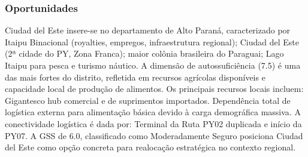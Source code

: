 \newpage

\subsubsection*{Oportunidades}\label{oport-ciudad-del-este-1001}
Ciudad del Este insere-se no departamento de Alto Paraná, caracterizado por Itaipu Binacional (royalties, empregos, infraestrutura regional); Ciudad del Este (2ª cidade do PY, Zona Franca); maior colônia brasileira do Paraguai; Lago Itaipu para pesca e turismo náutico. A dimensão de autossuficiência (7.5) é uma das mais fortes do distrito, refletida em recursos agrícolas disponíveis e capacidade local de produção de alimentos. Os principais recursos locais incluem: Gigantesco hub comercial e de suprimentos importados. Dependência total de logística externa para alimentação básica devido à carga demográfica massiva. A conectividade logística é dada por: Terminal da Ruta PY02 duplicada e início da PY07. A GSS de 6.0, classificado como Moderadamente Seguro posiciona Ciudad del Este como opção concreta para realocação estratégica no contexto regional.

